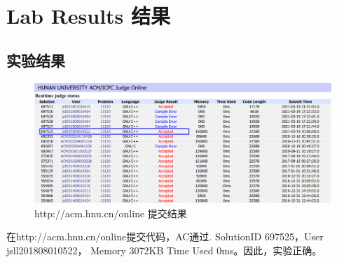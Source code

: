 \section{Lab Results 结果}
\subsection{实验结果}

\begin{figure}[htbp]	%
    \centering
    \includegraphics[width=1\linewidth]{Figure/solution.png}
    \caption{http://acm.hnu.cn/online 提交结果}
    \label{fig:figure1latexintro}
\end{figure}
在http://acm.hnu.cn/online提交代码，AC通过. SolutionID 697525，User jsll201808010522，	
Memory 3072KB	Time Used 0ms。因此，实验正确。